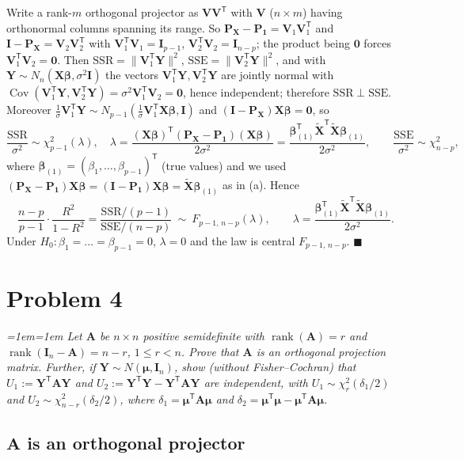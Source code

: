 \documentclass[11pt]{article}
\DeclareMathOperator{\rank}{rank}
\DeclareMathOperator{\Cov}{Cov}
\newcommand{\bX}{\mathbf{X}}
\newcommand{\bY}{\mathbf{Y}}
\newcommand{\bA}{\mathbf{A}}
\newcommand{\bI}{\mathbf{I}}
\newcommand{\bP}{\mathbf{P}}
\newcommand{\bV}{\mathbf{V}}
\newcommand{\bzero}{\mathbf{0}}
\newcommand{\bone}{\mathbf{1}}
\newcommand{\bbeta}{\bm{\beta}}
\newcommand{\bmu}{\bm{\mu}}
\newcommand{\Xt}{\widetilde{\bX}}
\newcommand{\T}{^{\mathsf{T}}}
\theoremstyle{remark}
\newenvironment{question}%
  {\smallskip\itshape\leftskip=1em\rightskip=1em\relax}%
  {\par\smallskip\noindent\hrulefill\par}
\begin{document}
Write a rank-$m$ orthogonal projector as $\bV\bV\T$ with $\bV$ ($n\times m$) having orthonormal columns
spanning its range. So $\bP_{\bX}-\bP_{\bone}=\bV_1\bV_1\T$ and $\bI-\bP_{\bX}=\bV_2\bV_2\T$ with
$\bV_1\T\bV_1=\bI_{p-1}$, $\bV_2\T\bV_2=\bI_{n-p}$; the product being $\bzero$ forces $\bV_1\T\bV_2=\bzero$.
Then $\mathrm{SSR}=\lVert\bV_1\T\bY\rVert^2$, $\mathrm{SSE}=\lVert\bV_2\T\bY\rVert^2$, and with
$\bY\sim N_n(\bX\bbeta,\sigma^2\bI)$ the vectors $\bV_1\T\bY,\bV_2\T\bY$ are jointly normal with
$\Cov(\bV_1\T\bY,\bV_2\T\bY)=\sigma^2\bV_1\T\bV_2=\bzero$, hence independent; therefore
$\mathrm{SSR}\perp\mathrm{SSE}$. Moreover $\tfrac1\sigma\bV_1\T\bY\sim N_{p-1}(\tfrac1\sigma\bV_1\T\bX\bbeta,\bI)$
and $(\bI-\bP_{\bX})\bX\bbeta=\bzero$, so
\[
\frac{\mathrm{SSR}}{\sigma^2}\sim\chi^2_{p-1}(\lambda),\quad
\lambda=\frac{(\bX\bbeta)\T(\bP_{\bX}-\bP_{\bone})(\bX\bbeta)}{2\sigma^2}
=\frac{\bbeta_{(1)}\T\Xt\T\Xt\bbeta_{(1)}}{2\sigma^2},
\qquad \frac{\mathrm{SSE}}{\sigma^2}\sim\chi^2_{n-p},
\]
where $\bbeta_{(1)}=(\beta_1,\dots,\beta_{p-1})\T$ (true values) and we used
$(\bP_{\bX}-\bP_{\bone})\bX\bbeta=(\bI-\bP_{\bone})\bX\bbeta=\Xt\bbeta_{(1)}$ as in (a). Hence
\[
\frac{n-p}{p-1}\cdot\frac{R^2}{1-R^2}=\frac{\mathrm{SSR}/(p-1)}{\mathrm{SSE}/(n-p)}\ \sim\
F_{p-1,\,n-p}(\lambda),\qquad\lambda=\frac{\bbeta_{(1)}\T\Xt\T\Xt\bbeta_{(1)}}{2\sigma^2}.
\]
Under $H_0:\beta_1=\dots=\beta_{p-1}=0$, $\lambda=0$ and the law is central $F_{p-1,\,n-p}$.
\hfill$\blacksquare$

\section*{Problem 4}

\begin{question}
Let $\bA$ be $n\times n$ positive semidefinite with $\rank(\bA)=r$ and $\rank(\bI_n-\bA)=n-r$,
$1\le r<n$. Prove that $\bA$ is an orthogonal projection matrix. Further, if $\bY\sim N(\bmu,\bI_n)$, show
(without Fisher--Cochran) that $U_1:=\bY\T\bA\bY$ and $U_2:=\bY\T\bY-\bY\T\bA\bY$ are independent, with
$U_1\sim\chi^2_r(\delta_1/2)$ and $U_2\sim\chi^2_{n-r}(\delta_2/2)$, where $\delta_1=\bmu\T\bA\bmu$ and
$\delta_2=\bmu\T\bmu-\bmu\T\bA\bmu$.
\end{question}

\subsection*{$\bA$ is an orthogonal projector}
\end{document}
